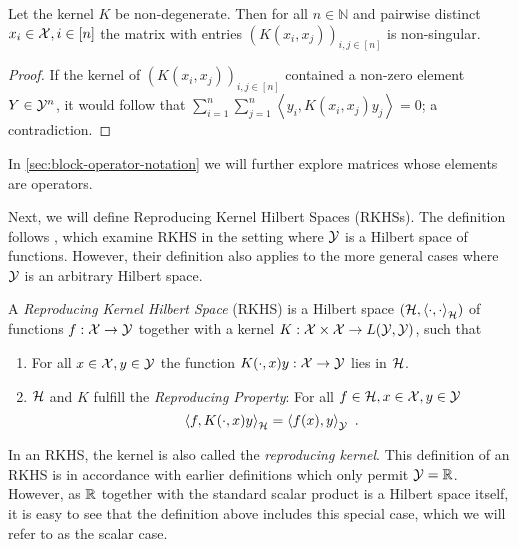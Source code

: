 \begin{lemma}
	\label{lem:kernel-non-singular}
	Let the kernel $K$ be non-degenerate.
	Then for all $n \in \mathbb{N}$ and pairwise distinct $x_i \in \mathcal{X}, i \in [n]$ the matrix with entries $(K(x_i, x_j))_{i, j \in [n]}$ is non-singular.
\end{lemma}
\begin{proof}
	If the kernel of $(K(x_i, x_j))_{i, j \in [n]}$ contained a non-zero element $Y \in \mathcal{Y}^n$, it would follow that $\sum_{i=1}^n \sum_{j=1}^n \left< y_i, K(x_i, x_j)  y_j\right> = 0$; a contradiction.
\end{proof}
In \cref{sec:block-operator-notation} we will further explore matrices whose elements are operators.

Next, we will define Reproducing Kernel Hilbert Spaces (RKHSs).
The definition follows \citet{kadri16}, which examine RKHS in the setting where $\mathcal{Y}$ is a Hilbert space of functions.
However, their definition also applies to the more general cases where $\mathcal{Y}$ is an arbitrary Hilbert space.
\begin{definition}
	\label{def:rkhs}
	A \emph{Reproducing Kernel Hilbert Space} (RKHS) is a Hilbert space $(\mathcal{H}, \left<\cdot, \cdot\right>_{\mathcal{H}})$ of functions $f: \mathcal{X} \rightarrow \mathcal{Y}$ together with a kernel $K: \mathcal{X} \times \mathcal{X} \rightarrow L(\mathcal{Y}, \mathcal{Y})$, such that
	\begin{enumerate}
		\item For all $x\in \mathcal{X}, y \in \mathcal{Y}$ the function $K(\cdot, x) y: \mathcal{X} \rightarrow \mathcal{Y}$ lies in $\mathcal{H}$.
		\item $\mathcal{H}$ and $K$ fulfill the \emph{Reproducing Property}: For all $f \in \mathcal{H}, x \in \mathcal{X}, y \in \mathcal{Y}$
		\begin{equation}
			\label{eq:reproducing-property}
			\left< f, K(\cdot, x) y \right>_{\mathcal{H}} = \left< f(x), y\right>_{\mathcal{Y}} \ .
		\end{equation}
	\end{enumerate}
\end{definition}

In an RKHS, the kernel is also called the \emph{reproducing kernel}.
This definition of an RKHS is in accordance with earlier definitions \cite{berlinet04, sejdinovic12} which only permit $\mathcal{Y} = \mathbb{R}$.
However, as $\mathbb{R}$ together with the standard scalar product is a Hilbert space itself, it is easy to see that the definition above includes this special case, which we will refer to as the scalar case.

